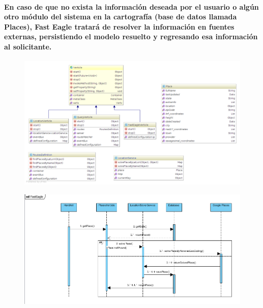     \paragraph{En caso de que no exista la información deseada por el usuario o algún otro módulo del sistema en la cartografía (base de datos llamada Places), Fast Eagle tratará de resolver la información en fuentes externas, persistiendo el modelo resuelto y regresando esa información al solicitante.}
    \begin{figure}[h!]
        \centering
          \includegraphics[width=\textwidth]{./images/FastEagleClassDiagram}
    \end{figure}
    \begin{figure}[h!]
        \centering
          \includegraphics[width=\textwidth]{./images/FastEagleSequenceDiagram}
    \end{figure}
